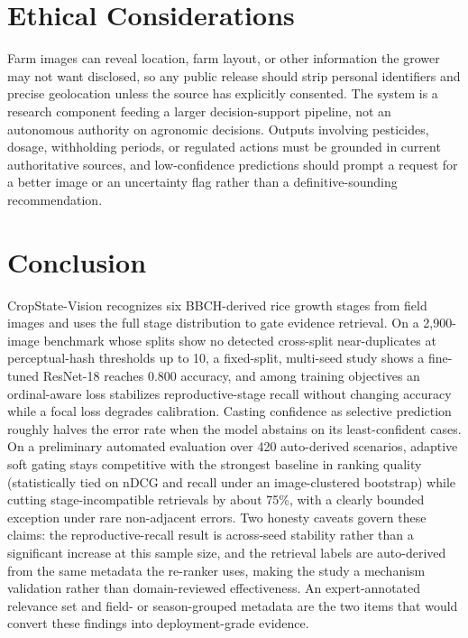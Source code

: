 \documentclass[conference]{IEEEtran}
\begin{document}
\section{Ethical Considerations}

Farm images can reveal location, farm layout, or other information the grower may not want disclosed, so any public release should strip personal identifiers and precise geolocation unless the source has explicitly consented. The system is a research component feeding a larger decision-support pipeline, not an autonomous authority on agronomic decisions. Outputs involving pesticides, dosage, withholding periods, or regulated actions must be grounded in current authoritative sources, and low-confidence predictions should prompt a request for a better image or an uncertainty flag rather than a definitive-sounding recommendation.

\section{Conclusion}

CropState-Vision recognizes six BBCH-derived rice growth stages from field images and uses the full stage distribution to gate evidence retrieval. On a 2{,}900-image benchmark whose splits show no detected cross-split near-duplicates at perceptual-hash thresholds up to 10, a fixed-split, multi-seed study shows a fine-tuned ResNet-18 reaches 0.800 accuracy, and among training objectives an ordinal-aware loss stabilizes reproductive-stage recall without changing accuracy while a focal loss degrades calibration. Casting confidence as selective prediction roughly halves the error rate when the model abstains on its least-confident cases. On a preliminary automated evaluation over 420 auto-derived scenarios, adaptive soft gating stays competitive with the strongest baseline in ranking quality (statistically tied on nDCG and recall under an image-clustered bootstrap) while cutting stage-incompatible retrievals by about 75\%, with a clearly bounded exception under rare non-adjacent errors. Two honesty caveats govern these claims: the reproductive-recall result is across-seed stability rather than a significant increase at this sample size, and the retrieval labels are auto-derived from the same metadata the re-ranker uses, making the study a mechanism validation rather than domain-reviewed effectiveness. An expert-annotated relevance set and field- or season-grouped metadata are the two items that would convert these findings into deployment-grade evidence.
\end{document}
